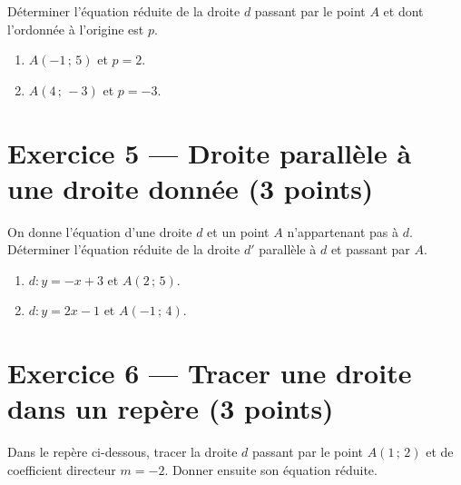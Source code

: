 \documentclass[11pt,a4paper]{article}
\begin{document}
\noindent\small Déterminer l'équation réduite de la droite $d$ passant par le point $A$
et dont l'ordonnée à l'origine est $p$.

\begin{enumerate}[label=\textbf{\arabic*.}, leftmargin=18pt]
  \item $A(-1\,;\,5)$ et $p = 2$.
  \item $A(4\,;\,-3)$ et $p = -3$.
\end{enumerate}

\vspace{4pt}

\section*{Exercice 5 — Droite parallèle à une droite donnée \hfill \normalsize (3 points)}

\noindent\small On donne l'équation d'une droite $d$ et un point $A$ n'appartenant pas à $d$.
Déterminer l'équation réduite de la droite $d'$ parallèle à $d$ et passant par $A$.

\begin{enumerate}[label=\textbf{\arabic*.}, leftmargin=18pt]
  \item $d : y = -x + 3$ et $A(2\,;\,5)$.
  \item $d : y = 2x - 1$ et $A(-1\,;\,4)$.
\end{enumerate}

\vspace{4pt}

\section*{Exercice 6 — Tracer une droite dans un repère \hfill \normalsize (3 points)}

\noindent\small Dans le repère ci-dessous, tracer la droite $d$ passant par le point
$A(1\,;\,2)$ et de coefficient directeur $m = -2$. Donner ensuite son équation réduite.

\begin{center}
\end{center}
\end{document}
